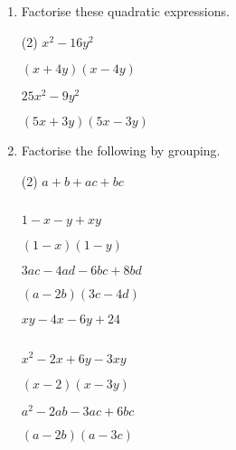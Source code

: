 \begin{enumerate} [leftmargin=0cm]
\item Factorise these quadratic expressions.
	\begin{tasks}[label=(\alph*), after-item-skip=2pt,after-skip=3pt, label-width=4ex](2)
		\task  $ x^2 -16y^2                            $  \\  \begin{envAnswer} $  (x+4y)(x-4y)      $ \end{envAnswer}
		\task  $ 25x^2 -9y^2                           $  \\  \begin{envAnswer} $  (5x+3y)(5x-3y)    $ \end{envAnswer}
	\end{tasks}    


\item Factorise the following by grouping.
    \begin{tasks}[label=(\alph*), after-item-skip=2pt,after-skip=3pt, label-width=4ex](2)
	    \task $a+b+ac+bc$             \\ \begin{envAnswer}[blankline=3]         $                     $ \end{envAnswer}
		\task $1-x-y+xy$              \\ \begin{envAnswer}[blankline=3]         $(1-x)(1-y)           $ \end{envAnswer} 
		\task $3ac-4ad-6bc+8bd$       \\ \begin{envAnswer}[blankline=3]         $(a-2b)(3c-4d)        $ \end{envAnswer}
        \task $xy-4x-6y+24$           \\ \begin{envAnswer}[blankline=3]         $                     $ \end{envAnswer}		
		\task $x^2-2x+6y-3xy$         \\ \begin{envAnswer}[blankline=3]         $(x-2)(x-3y)          $ \end{envAnswer}	
		\task $a^2-2ab-3ac+6bc$       \\ \begin{envAnswer}[blankline=3]         $(a-2b)(a-3c)          $ \end{envAnswer}
    \end{tasks}


\end{enumerate}
